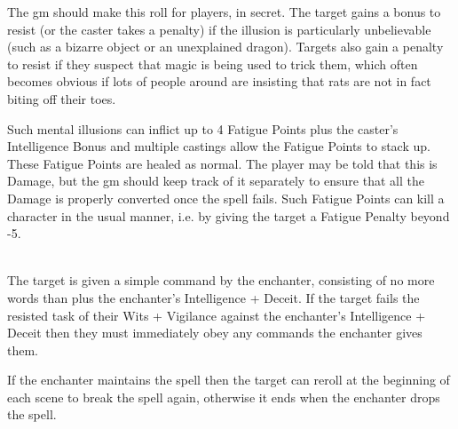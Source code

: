 \begin{multicols}{2}
The \gls{gm} should make this roll for players, in secret. The target gains a bonus to resist (or the caster takes a penalty) if the illusion is particularly unbelievable (such as a bizarre object or an unexplained dragon). Targets also gain a penalty to resist if they suspect that magic is being used to trick them, which often becomes obvious if lots of people around are insisting that rats are not in fact biting off their toes.

Such mental illusions can inflict up to 4 Fatigue Points plus the caster's Intelligence Bonus and multiple castings allow the Fatigue Points to stack up. These Fatigue Points are healed as normal. The player may be told that this is Damage, but the \gls{gm} should keep track of it separately to ensure that all the Damage is properly converted once the spell fails. Such Fatigue Points can kill a character in the usual manner, i.e. by giving the target a Fatigue Penalty beyond -5.

\spelllevel

\\
The target is given a simple command by the enchanter, consisting of no more words than  plus the enchanter's Intelligence + Deceit. If the target fails the resisted task of their Wits + Vigilance against the enchanter's Intelligence + Deceit then they must immediately obey any commands the enchanter gives them.

If the enchanter maintains the spell then the target can reroll at the beginning of each scene to break the spell again, otherwise it ends when the enchanter drops the spell.

\end{multicols}

